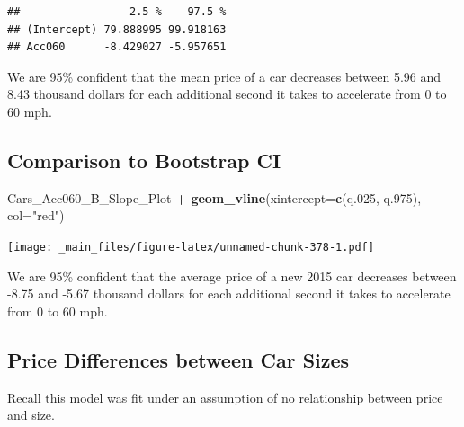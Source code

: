 \documentclass[]{book}
\newenvironment{Shaded}{\begin{snugshade}}{\end{snugshade}}
\newcommand{\KeywordTok}[1]{\textcolor[rgb]{0.13,0.29,0.53}{\textbf{#1}}}
\newcommand{\DataTypeTok}[1]{\textcolor[rgb]{0.13,0.29,0.53}{#1}}
\newcommand{\DecValTok}[1]{\textcolor[rgb]{0.00,0.00,0.81}{#1}}
\newcommand{\StringTok}[1]{\textcolor[rgb]{0.31,0.60,0.02}{#1}}
\newcommand{\OperatorTok}[1]{\textcolor[rgb]{0.81,0.36,0.00}{\textbf{#1}}}
\newcommand{\NormalTok}[1]{#1}
\begin{document}
\begin{verbatim}
##                 2.5 %    97.5 %
## (Intercept) 79.888995 99.918163
## Acc060      -8.429027 -5.957651
\end{verbatim}

We are 95\% confident that the mean price of a car decreases between
5.96 and 8.43 thousand dollars for each additional second it takes to
accelerate from 0 to 60 mph.

\subsection{Comparison to Bootstrap
CI}\label{comparison-to-bootstrap-ci}

\begin{Shaded}
\end{Shaded}

\begin{Shaded}
\begin{Highlighting}[]
\NormalTok{Cars_Acc060_B_Slope_Plot }\OperatorTok{+}\StringTok{ }\KeywordTok{geom_vline}\NormalTok{(}\DataTypeTok{xintercept=}\KeywordTok{c}\NormalTok{(q.}\DecValTok{025}\NormalTok{, q.}\DecValTok{975}\NormalTok{), }\DataTypeTok{col=}\StringTok{"red"}\NormalTok{)}
\end{Highlighting}
\end{Shaded}

\texttt{[image: \_main\_files/figure-latex/unnamed-chunk-378-1.pdf]}

We are 95\% confident that the average price of a new 2015 car decreases
between -8.75 and -5.67 thousand dollars for each additional second it
takes to accelerate from 0 to 60 mph.

\subsection{Price Differences between Car
Sizes}\label{price-differences-between-car-sizes}

Recall this model was fit under an assumption of no relationship between
price and size.
\end{document}
